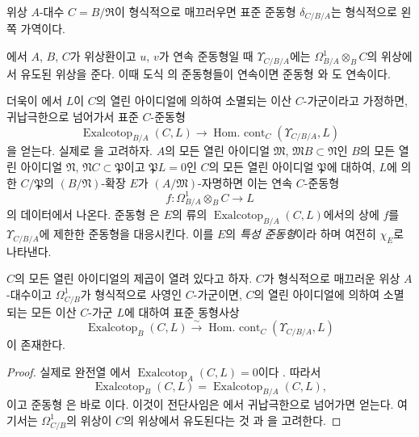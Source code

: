 \begin{corollary}[20.7.9]
\label{0.20.7.9-ko}
위상 $A$-대수 $C=B/\mathfrak R$이 형식적으로 매끄러우면 표준 준동형
$\delta_{C/B/A}$는 형식적으로 왼쪽 가역이다.
\end{corollary}

\begin{env}[20.7.10]
\label{0.20.7.10-ko}
에서 $A$, $B$, $C$가 위상환이고 $u$, $v$가 연속
준동형일 때 $\Upsilon_{C/B/A}$에는
$\Omega^1_{B/A}\otimes_B C$의 위상에서 유도된 위상을 준다. 이때 도식
의 준동형들이 연속이면 준동형
와 도 연속이다.

더욱이 에서 $L$이 $C$의 열린 아이디얼에 의하여
소멸되는 이산 $C$-가군이라고 가정하면, 귀납극한으로 넘어가서 표준
$C$-준동형
\begin{equation}
\tag{20.7.10.1}
\label{0.20.7.10.1-ko}
  \operatorname{Exalcotop}_{B/A}(C,L)\longrightarrow
  \operatorname{Hom.\ cont}_C(\Upsilon_{C/B/A},L)
\end{equation}
을 얻는다. 실제로 을 고려하자. $A$의 모든 열린
아이디얼 $\mathfrak M$, $\mathfrak MB\subset\mathfrak N$인 $B$의 모든
열린 아이디얼 $\mathfrak N$, $\mathfrak NC\subset\mathfrak P$이고
$\mathfrak P L=0$인 $C$의 모든 열린 아이디얼 $\mathfrak P$에 대하여,
$L$에 의한 $C/\mathfrak P$의 $(B/\mathfrak N)$-확장 $E$가
$(A/\mathfrak M)$-자명하면 이는 연속 $C$-준동형
\[
  f:\Omega^1_{B/A}\otimes_B C\longrightarrow L
\]
의 데이터에서 나온다. 준동형 은 $E$의 류의
$\operatorname{Exalcotop}_{B/A}(C,L)$에서의 상에 $f$를
$\Upsilon_{C/B/A}$에 제한한 준동형을 대응시킨다. 이를 $E$의
\emph{특성 준동형}이라 하며 여전히 $\chi_E$로 나타낸다.
\end{env}

\begin{proposition}[20.7.11]
\label{0.20.7.11-ko}
$C$의 모든 열린 아이디얼의 제곱이 열려 있다고 하자. $C$가
형식적으로 매끄러운 위상 $A$-대수이고 $\Omega^1_{C/B}$가 형식적으로
사영인 $C$-가군이면, $C$의 열린 아이디얼에 의하여 소멸되는 모든 이산
$C$-가군 $L$에 대하여 표준 동형사상
\begin{equation}
\tag{20.7.11.1}
\label{0.20.7.11.1-ko}
  \operatorname{Exalcotop}_B(C,L)\xrightarrow{\sim}
  \operatorname{Hom.\ cont}_C(\Upsilon_{C/B/A},L)
\end{equation}
이 존재한다.
\end{proposition}

\begin{proof}
실제로 완전열 에서
$\operatorname{Exalcotop}_A(C,L)=0$이다 . 따라서
\[
  \operatorname{Exalcotop}_B(C,L)
  =\operatorname{Exalcotop}_{B/A}(C,L),
\]
이고 준동형 은 바로
이다. 이것이 전단사임은
에서 귀납극한으로 넘어가면 얻는다. 여기서는
$\Omega^1_{C/B}$의 위상이 $C$의 위상에서 유도된다는 것
과 을 고려한다.
\end{proof}

